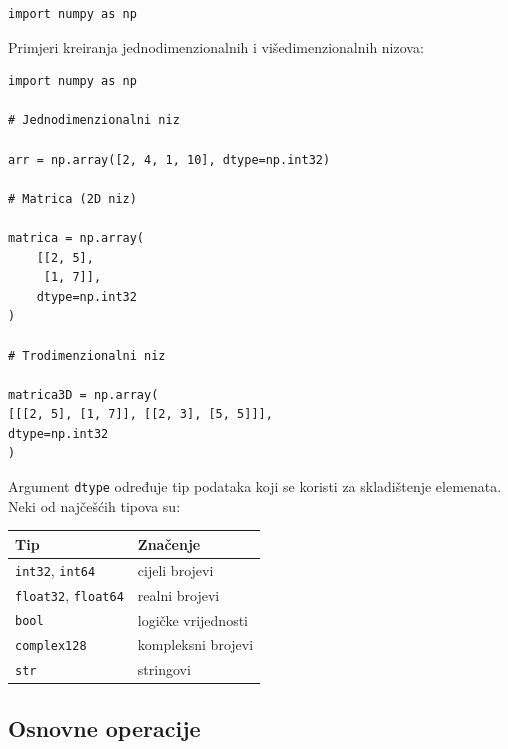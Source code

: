 \begin{verbatim}
import numpy as np
\end{verbatim}

Primjeri kreiranja jednodimenzionalnih i višedimenzionalnih nizova:

\begin{verbatim}
import numpy as np

# Jednodimenzionalni niz

arr = np.array([2, 4, 1, 10], dtype=np.int32)

# Matrica (2D niz)

matrica = np.array(
    [[2, 5],
     [1, 7]],
    dtype=np.int32
)

# Trodimenzionalni niz

matrica3D = np.array(
[[[2, 5], [1, 7]], [[2, 3], [5, 5]]],
dtype=np.int32
)
\end{verbatim}

Argument \texttt{dtype} određuje tip podataka koji se koristi za skladištenje elemenata. Neki od najčešćih tipova su:

\begin{center}
	\begin{tabular}{ll}
		\textbf{Tip} & \textbf{Značenje} \\ \hline
		\texttt{int32}, \texttt{int64} & cijeli brojevi \\
		\texttt{float32}, \texttt{float64} & realni brojevi \\
		\texttt{bool} & logičke vrijednosti \\
		\texttt{complex128} & kompleksni brojevi \\
		\texttt{str} & stringovi  \\ \hline \hline
	\end{tabular} 
\end{center}

\subsection*{Osnovne operacije}

